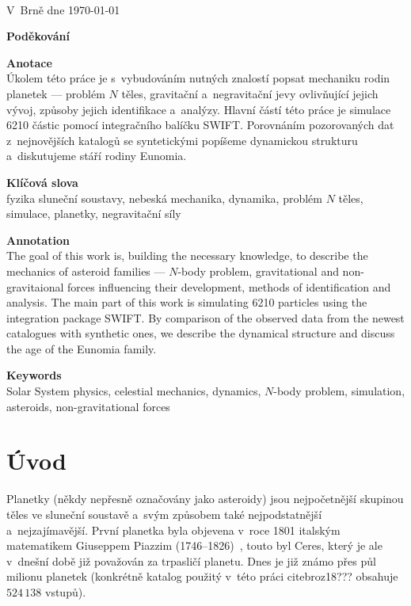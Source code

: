 \documentclass[A4paper, 12pt, oneside]{book}
\begin{document}
\

V~Brně dne \today\ \dotfill \hspace{10mm}

\newpage

{\large \bfseries Poděkování}

\newpage

{\large \bfseries Anotace}\\
Úkolem této práce je s~vybudováním nutných znalostí popsat mechaniku rodin planetek --- problém $N$ těles, gravitační a~negravitační jevy ovlivňující jejich vývoj, způsoby jejich identifikace a~analýzy. Hlavní částí této práce je simulace 6210 částic pomocí integračního balíčku SWIFT. Porovnáním pozorovaných dat z~nejnovějších katalogů se syntetickými popíšeme dynamickou strukturu a~diskutujeme stáří rodiny Eunomia.

{\large \bfseries Klíčová slova}\\
fyzika sluneční soustavy, nebeská mechanika, dynamika, problém $N$ těles, simulace, planetky, negravitační síly

\vspace{24pt}

{\large \bfseries Annotation}\\
The goal of this work is, building the necessary knowledge, to describe the mechanics of asteroid families --- $N$-body problem, gravitational and non-gravitaional forces influencing their development, methods of identification and analysis. The main part of this work is simulating 6210 particles using the integration package SWIFT. By comparison of the observed data from the newest catalogues with synthetic ones, we describe the dynamical structure and discuss the age of the Eunomia family.

{\large \bfseries Keywords}\\
Solar System physics, celestial mechanics, dynamics, $N$-body problem, simulation, asteroids, non-gravitational forces

\newpage

\tableofcontents

\newpage 
\pagestyle{headings} %
\chapter{Úvod} \label{ch:uvod}
Planetky (někdy nepřesně označovány jako asteroidy) jsou nejpočetnější skupinou těles ve sluneční soustavě a~svým způsobem také nejpodstatnější a~nejzajímavější. První planetka byla objevena v~roce 1801 italským matematikem Giuseppem Piazzim (1746--1826)~\cite{wiki:piazzi}, touto  byl Ceres, který je ale v~dnešní době již považován za trpasličí planetu. Dnes je již známo přes půl milionu planetek (konkrétně katalog použitý v~této práci cite{broz18}??? obsahuje $524\,138$ vstupů).
\end{document}
